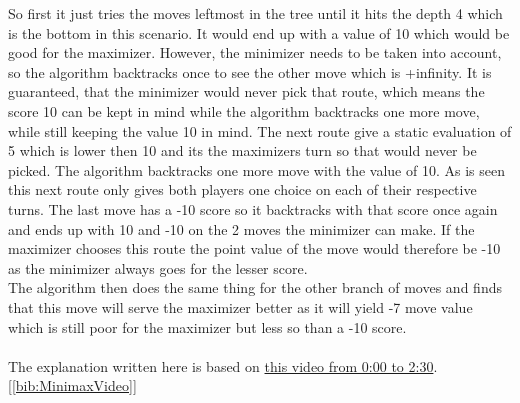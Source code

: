 So first it just tries the moves leftmost in the tree until it hits the depth 4 which is the bottom in this scenario. It would end up with a value of 10 which would be good for the maximizer. 
However, the minimizer needs to be taken into account, so the algorithm backtracks once to see the other move which is +infinity. 
It is guaranteed, that the minimizer would never pick that route, which means the score 10 can be kept in mind while the algorithm backtracks one more move, while still keeping the value 10 in mind.
The next route give a static evaluation of 5 which is lower then 10 and its the maximizers turn so that would never be picked. The algorithm backtracks one more move with the value of 10.
As is seen this next route only gives both players one choice on each of their respective turns. 
The last move has a -10 score so it backtracks with that score once again and ends up with 10 and -10 on the 2 moves the minimizer can make. 
If the maximizer chooses this route the point value of the move would therefore be -10 as the minimizer always goes for the lesser score.\\
The algorithm then does the same thing for the other branch of moves and finds that this move will serve the maximizer better as it will yield -7 move value which is still poor for the maximizer but less so than a -10 score.\\\\
The explanation written here is based on \href{https://www.youtube.com/watch?v=l-hh51ncgDI}{this video from 0:00 to 2:30}.[\ref{bib:MinimaxVideo}]
\clearpage
